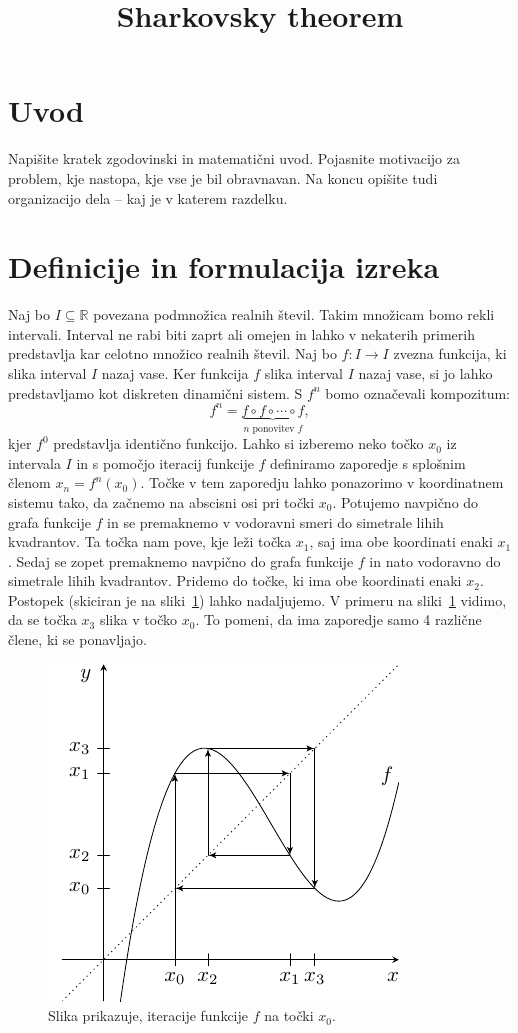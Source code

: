 \documentclass[mat2]{fmfdelo}
\title{Sharkovsky theorem}
\newcommand{\R}{\mathbb R}
\begin{document}
\section{Uvod}
Napišite kratek zgodovinski in matematični uvod.  Pojasnite motivacijo za problem, kje
nastopa, kje vse je bil obravnavan. Na koncu opišite tudi organizacijo dela -- kaj je v
katerem razdelku.

\section{Definicije in formulacija izreka}
Naj bo $I\subseteq \R$ povezana podmnožica realnih števil. Takim množicam bomo rekli intervali. Interval ne rabi biti zaprt ali omejen in lahko v nekaterih primerih predstavlja kar celotno množico realnih števil. Naj bo $f:I \to I$ zvezna funkcija, ki slika interval $I$ nazaj vase. Ker funkcija $f$ slika interval $I$ nazaj vase, si jo lahko predstavljamo kot diskreten dinamični sistem. S $f^n$ bomo označevali kompozitum:
$$f^n = \underbrace{f \circ f \circ \cdots \circ f}_{n \text{ ponovitev } f},$$
kjer $f^0$ predstavlja identično funkcijo. Lahko si izberemo neko točko $x_0$ iz intervala $I$ in s pomočjo iteracij funkcije $f$ definiramo zaporedje s splošnim členom $x_n = f^n(x_0)$. Točke v tem zaporedju lahko ponazorimo v koordinatnem sistemu tako, da začnemo na abscisni osi pri točki $x_0$. Potujemo navpično do grafa funkcije $f$ in se premaknemo v vodoravni smeri do simetrale lihih kvadrantov. Ta točka nam pove, kje leži točka $x_1$, saj ima obe koordinati enaki $x_1$. Sedaj se zopet premaknemo navpično do grafa funkcije $f$ in nato vodoravno do simetrale lihih kvadrantov. Pridemo do točke, ki ima obe koordinati enaki $x_2$. Postopek (skiciran je na sliki~\ref{fig:iteracije}) lahko nadaljujemo. V primeru na sliki~\ref{fig:iteracije} vidimo, da se točka $x_3$ slika v točko $x_0$. To pomeni, da ima zaporedje samo 4 različne člene, ki se ponavljajo.

\begin{figure}[h]
  \centering
  \includegraphics[]{images/iteracije_f.pdf}
  \caption[Primer vektorske slike.]{Slika prikazuje, iteracije funkcije $f$ na točki $x_0$.}
  \label{fig:iteracije}
\end{figure}
\end{document}
